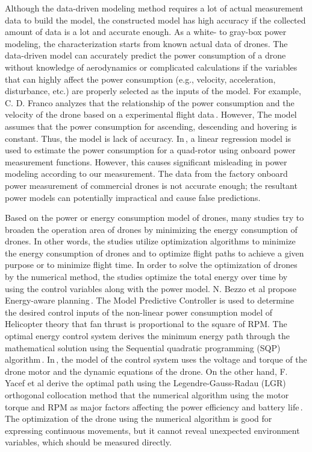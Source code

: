 \documentclass[journal]{./template/IEEEtran}
\begin{document}
Although the data-driven modeling method requires a lot of actual measurement data to build the model, the constructed model has high accuracy if the collected amount of data is a lot and accurate enough.
As a white- to gray-box power modeling, the characterization starts from known actual data of drones. 
The data-driven model can accurately predict the power consumption of a drone without knowledge of aerodynamics or complicated calculations if the variables that can highly affect the power consumption (e.g., velocity, acceleration, disturbance, etc.) are properly selected as the inputs of the model.
For example, C. D. Franco analyzes that the relationship of the power consumption and the velocity of the drone based on a experimental flight data\,\cite{ref_8}.  
However, The model assumes that the power consumption for ascending, descending and hovering is constant. Thus, the model is lack of accuracy.
In\,\cite{ref_9}, a linear regression model is used to estimate the power consumption for a quad-rotor using onboard power measurement functions. 
However, this causes significant misleading in power modeling according to our measurement.
The data from the factory onboard power measurement of commercial drones is not accurate enough; the resultant power models can potentially impractical and cause false predictions.

Based on the power or energy consumption model of drones, many studies try to broaden the operation area of drones by minimizing the energy consumption of drones.
In other words, the studies utilize optimization algorithms to minimize the energy consumption of drones and to optimize flight paths to achieve a given purpose or to minimize flight time.
In order to solve the optimization of drones by the numerical method, the studies optimize the total energy over time by using the control variables along with the power model. 
N. Bezzo et al propose Energy-aware planning\,\cite{ref_5}. The Model Predictive Controller is used to determine the desired control inputs of the non-linear power consumption model of Helicopter theory that fan thrust is proportional to the square of RPM.
The optimal energy control system derives the minimum energy path through the mathematical solution using the Sequential quadratic programming (SQP) algorithm\,\cite{ref_6}. 
In\,\cite{ref_6}, the model of the control system uses the voltage and torque of the drone motor and the dynamic equations of the drone. 
On the other hand, F. Yacef et al derive the optimal path using the Legendre-Gauss-Radau (LGR) orthogonal collocation method that the numerical algorithm using the motor torque and RPM as major factors affecting the power efficiency and battery life\,\cite{ref_7}. 
The optimization of the drone using the numerical algorithm is good for expressing continuous movements, but it cannot reveal unexpected environment variables, which should be measured directly.
\end{document}
